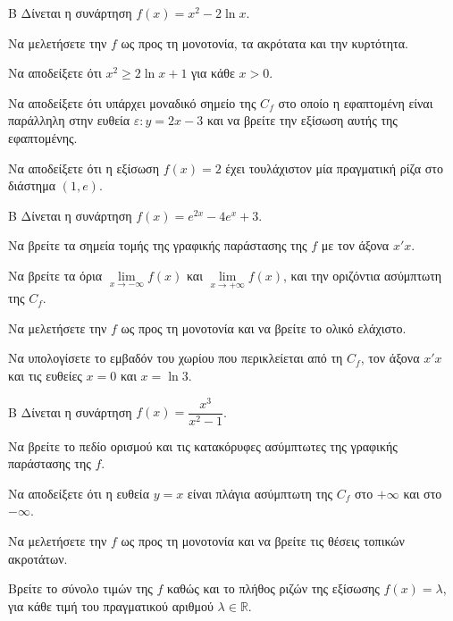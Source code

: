 \begin{thema}{Β}
Δίνεται η συνάρτηση $f(x) = x^2 - 2\ln x$.
\begin{erwthma}
\item Να μελετήσετε την $f$ ως προς τη μονοτονία, τα ακρότατα και την κυρτότητα.
\item Να αποδείξετε ότι $x^2 \ge 2\ln x + 1$ για κάθε $x > 0$.
\item Να αποδείξετε ότι υπάρχει μοναδικό σημείο της $C_f$ στο οποίο η εφαπτομένη είναι παράλληλη στην ευθεία $\varepsilon: y = 2x - 3$ και να βρείτε την εξίσωση αυτής της εφαπτομένης.
\item Να αποδείξετε ότι η εξίσωση $f(x) = 2$ έχει τουλάχιστον μία πραγματική ρίζα στο διάστημα $(1, e)$.
\end{erwthma}
\end{thema}

\begin{thema}{Β}
Δίνεται η συνάρτηση $f(x) = e^{2x} - 4e^x + 3$.
\begin{erwthma}
\item Να βρείτε τα σημεία τομής της γραφικής παράστασης της $f$ με τον άξονα $x'x$.
\item Να βρείτε τα όρια $\lim\limits_{x \to -\infty} f(x)$ και $\lim\limits_{x \to +\infty} f(x)$, και την οριζόντια ασύμπτωτη της $C_f$.
\item Να μελετήσετε την $f$ ως προς τη μονοτονία και να βρείτε το ολικό ελάχιστο.
\item Να υπολογίσετε το εμβαδόν του χωρίου που περικλείεται από τη $C_f$, τον άξονα $x'x$ και τις ευθείες $x=0$ και $x=\ln 3$.
\end{erwthma}
\end{thema}

\begin{thema}{Β}
Δίνεται η συνάρτηση $f(x) = \dfrac{x^3}{x^2-1}$.
\begin{erwthma}
\item Να βρείτε το πεδίο ορισμού και τις κατακόρυφες ασύμπτωτες της γραφικής παράστασης της $f$.
\item Να αποδείξετε ότι η ευθεία $y = x$ είναι πλάγια ασύμπτωτη της $C_f$ στο $+\infty$ και στο $-\infty$.
\item Να μελετήσετε την $f$ ως προς τη μονοτονία και να βρείτε τις θέσεις τοπικών ακροτάτων.
\item Βρείτε το σύνολο τιμών της $f$ καθώς και το πλήθος ριζών της εξίσωσης $f(x)=\lambda$, για κάθε τιμή του πραγματικού αριθμού $\lambda\in\mathbb{R}$.
\end{erwthma}
\end{thema}

